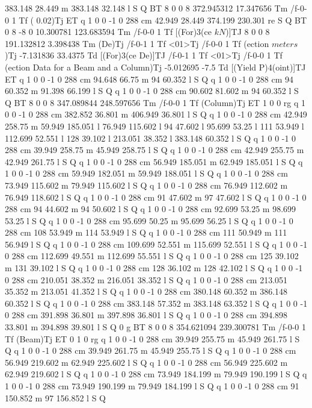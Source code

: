 383.148 28.449 m 383.148 32.148 l S Q
BT
8 0 0 8 372.945312 17.347656 Tm
/f-0-0 1 Tf
( 0.02)Tj
ET
q 1 0 0 -1 0 288 cm
42.949 28.449 374.199 230.301 re S Q
BT
0 8 -8 0 10.300781 123.683594 Tm
/f-0-0 1 Tf
[(For)3(ce \(kN\))]TJ
8 0 0 8 191.132812 3.398438 Tm
(De)Tj
/f-0-1 1 Tf
<01>Tj
/f-0-0 1 Tf
(ection \(meters\))Tj
-7.131836 33.4375 Td
[(For)3(ce De)]TJ
/f-0-1 1 Tf
<01>Tj
/f-0-0 1 Tf
(ection Data for a Beam and a Column)Tj
-5.012695 -7.5 Td
[(Yield P)4(oint)]TJ
ET
q 1 0 0 -1 0 288 cm
94.648 66.75 m 94 60.352 l S Q
q 1 0 0 -1 0 288 cm
94 60.352 m 91.398 66.199 l S Q
q 1 0 0 -1 0 288 cm
90.602 81.602 m 94 60.352 l S Q
BT
8 0 0 8 347.089844 248.597656 Tm
/f-0-0 1 Tf
(Column)Tj
ET
1 0 0 rg
q 1 0 0 -1 0 288 cm
382.852 36.801 m 406.949 36.801 l S Q
q 1 0 0 -1 0 288 cm
42.949 258.75 m 59.949 185.051 l 76.949 115.602 l 94 47.602 l 95.699 53.25
 l 111 53.949 l 112.699 52.551 l 128 39.102 l 213.051 38.352 l 383.148 60.352
 l S Q
q 1 0 0 -1 0 288 cm
39.949 258.75 m 45.949 258.75 l S Q
q 1 0 0 -1 0 288 cm
42.949 255.75 m 42.949 261.75 l S Q
q 1 0 0 -1 0 288 cm
56.949 185.051 m 62.949 185.051 l S Q
q 1 0 0 -1 0 288 cm
59.949 182.051 m 59.949 188.051 l S Q
q 1 0 0 -1 0 288 cm
73.949 115.602 m 79.949 115.602 l S Q
q 1 0 0 -1 0 288 cm
76.949 112.602 m 76.949 118.602 l S Q
q 1 0 0 -1 0 288 cm
91 47.602 m 97 47.602 l S Q
q 1 0 0 -1 0 288 cm
94 44.602 m 94 50.602 l S Q
q 1 0 0 -1 0 288 cm
92.699 53.25 m 98.699 53.25 l S Q
q 1 0 0 -1 0 288 cm
95.699 50.25 m 95.699 56.25 l S Q
q 1 0 0 -1 0 288 cm
108 53.949 m 114 53.949 l S Q
q 1 0 0 -1 0 288 cm
111 50.949 m 111 56.949 l S Q
q 1 0 0 -1 0 288 cm
109.699 52.551 m 115.699 52.551 l S Q
q 1 0 0 -1 0 288 cm
112.699 49.551 m 112.699 55.551 l S Q
q 1 0 0 -1 0 288 cm
125 39.102 m 131 39.102 l S Q
q 1 0 0 -1 0 288 cm
128 36.102 m 128 42.102 l S Q
q 1 0 0 -1 0 288 cm
210.051 38.352 m 216.051 38.352 l S Q
q 1 0 0 -1 0 288 cm
213.051 35.352 m 213.051 41.352 l S Q
q 1 0 0 -1 0 288 cm
380.148 60.352 m 386.148 60.352 l S Q
q 1 0 0 -1 0 288 cm
383.148 57.352 m 383.148 63.352 l S Q
q 1 0 0 -1 0 288 cm
391.898 36.801 m 397.898 36.801 l S Q
q 1 0 0 -1 0 288 cm
394.898 33.801 m 394.898 39.801 l S Q
0 g
BT
8 0 0 8 354.621094 239.300781 Tm
/f-0-0 1 Tf
(Beam)Tj
ET
0 1 0 rg
q 1 0 0 -1 0 288 cm
39.949 255.75 m 45.949 261.75 l S Q
q 1 0 0 -1 0 288 cm
39.949 261.75 m 45.949 255.75 l S Q
q 1 0 0 -1 0 288 cm
56.949 219.602 m 62.949 225.602 l S Q
q 1 0 0 -1 0 288 cm
56.949 225.602 m 62.949 219.602 l S Q
q 1 0 0 -1 0 288 cm
73.949 184.199 m 79.949 190.199 l S Q
q 1 0 0 -1 0 288 cm
73.949 190.199 m 79.949 184.199 l S Q
q 1 0 0 -1 0 288 cm
91 150.852 m 97 156.852 l S Q
